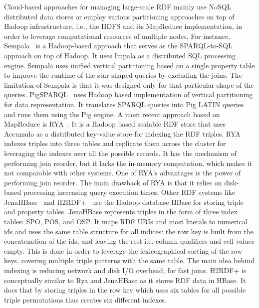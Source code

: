 Cloud-based approaches for managing large-scale \gls{RDF} mainly use NoSQL distributed data stores or employ various partitioning approaches on top of Hadoop infrastructure, i.e., the \gls{HDFS} and its MapReduce implementation, in order to leverage computational resources of multiple nodes. 
For instance, Sempala~\cite{Schatzle2014Sempala} is a Hadoop-based approach that serves as the SPARQL-to-SQL approach on top of Hadoop.
It uses Impala as a distributed SQL processing engine.
Sempala uses unified vertical partitioning based on a single property table to improve the runtime of the star-shaped queries by excluding the joins. 
The limitation of Sempala is that it was designed only for that particular shape of the queries.
PigSPARQL~\cite{Schatzle2011PMS} uses Hadoop based implementation of vertical partitioning for data representation. 
It translates \gls{SPARQL} queries into Pig LATIN queries and runs them using the Pig engine.
A most recent approach based on MapReduce is RYA~\cite{Punnoose2012Rya}.
It is a Hadoop based scalable \gls{RDF} store that uses Accumulo as a distributed key-value store for indexing the \gls{RDF} triples.
RYA indexes triples into three tables and replicate them across the cluster for leveraging the indexes over all the possible records.
It has the mechanism of performing join reorder, but it lacks the in-memory computation, which makes it not comparable with other systems.
One of RYA's advantages is the power of performing join reorder. 
The main drawback of RYA is that it relies on disk-based processing increasing query execution times.
Other \gls{RDF} systems like JenaHBase~\cite{KhadilkarKTC2012} and H2RDF+~\cite{PapailiouKTKK13} use the Hadoop database HBase for storing triple and property tables.
JenaHBase represents triples in the form of three index tables: SPO, POS, and OSP. 
It maps \gls{RDF} \gls{URI}s and most literals to numerical ids and uses the same table structure for all indices: the row key is built from the concatenation of the ids, and leaving the rest i.e. column qualifiers and cell values empty. 
This is done in order to leverage the lexicographical sorting of the row keys, covering multiple triple patterns with the same table.
The main idea behind indexing is reducing network and disk I/O overhead, for fast joins.
H2RDF+ is conceptually similar to Rya and JenaHBase as it stores RDF data in HBase. 
It does that by storing triples in the row key which uses six tables for all possible triple permutations thus creates six different indexes. 
